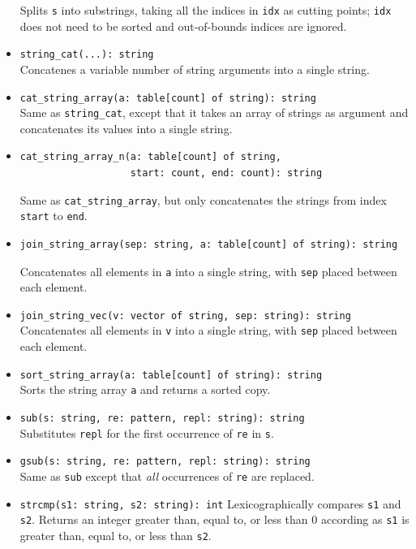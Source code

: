 \documentclass[10pt,landscape]{article}
\begin{document}
\begin{multicols*}{2}
\begin{itemize}
    Splits \texttt{s} into substrings, taking all the indices in
    \texttt{idx} as cutting points; \texttt{idx} does not need to be sorted and
    out-of-bounds indices are ignored.
  \item \verb|string_cat(...): string|\\
    Concatenes a variable number of string arguments into a single string.
  \item \verb|cat_string_array(a: table[count] of string): string|\\
    Same as \verb|string_cat|, except that it takes an array of strings as
    argument and concatenates its values into a single string.
  \item
\begin{verbatim}
cat_string_array_n(a: table[count] of string,
                   start: count, end: count): string
\end{verbatim}
    Same as \verb|cat_string_array|, but only concatenates the strings from
    index \verb|start| to \verb|end|.
  \item
\begin{verbatim}
join_string_array(sep: string, a: table[count] of string): string
\end{verbatim}
    Concatenates all elements in \verb|a| into a single string,
    with \verb|sep| placed between each element.
  \item \verb|join_string_vec(v: vector of string, sep: string): string|\\
    Concatenates all elements in \verb|v| into a single string,
    with \verb|sep| placed between each element.
  \item \verb|sort_string_array(a: table[count] of string): string|\\
    Sorts the string array \verb|a| and returns a sorted copy.
  \item \verb|sub(s: string, re: pattern, repl: string): string|\\
    Substitutes \texttt{repl} for the first occurrence of \texttt{re} in
    \texttt{s}.
  \item \verb|gsub(s: string, re: pattern, repl: string): string|\\
    Same as \texttt{sub} except that \emph{all} occurrences of \texttt{re} are
    replaced.
  \item \verb|strcmp(s1: string, s2: string): int|
    Lexicographically compares \texttt{s1} and \texttt{s2}. Returns an integer
    greater than, equal to, or less than 0 according as \texttt{s1} is greater
    than, equal to, or less than \texttt{s2}.

\end{itemize}
\end{multicols*}
\end{document}
